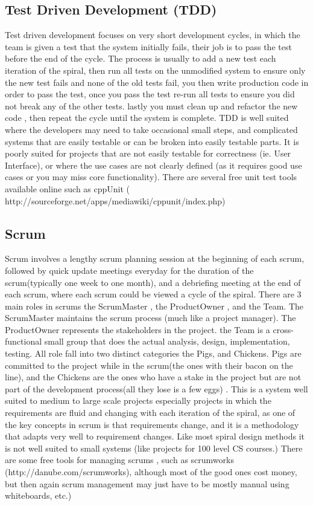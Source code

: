 \documentclass[10pt]{article}
\begin{document}
\subsection*{Test Driven Development (TDD)}
Test driven development focuses on very short development cycles, in which the team is given a test that the system initially fails, their job is to pass the test before the end of the cycle. The process is usually to add a new test each iteration of the spiral, then run all tests on the unmodified system to ensure only the new test fails and none of the old tests fail, you then write production code in order to pass the test, once you pass the test re-run all tests to ensure you did not break any of the other tests. lastly you must clean up and refactor the new code , then repeat the cycle until the system is complete. TDD is well suited where the developers may need to take occasional small steps, and complicated systems that are easily testable or can be broken into easily testable parts.  It is poorly suited for projects that are not easily testable for correctness (ie. User Interface), or where the use cases are not clearly defined (as it requires good use cases or you may miss core functionality). There are several free unit test tools available online such as cppUnit ( http://sourceforge.net/apps/mediawiki/cppunit/index.php)
\subsection*{Scrum}
Scrum involves a lengthy scrum planning session at the beginning of each scrum, followed by quick update meetings everyday for the duration of the scrum(typically one week to one month), and a debriefing meeting at the end of each scrum, where each scrum could be viewed a cycle of the spiral.  There are 3 main roles in scrums the ScrumMaster , the ProductOwner , and the Team.  The ScrumMaster maintains the scrum process (much like a project manager). The ProductOwner represents the stakeholders in the project. the Team is a cross-functional small group that does the actual analysis, design, implementation, testing.  All role fall into two distinct categories the Pigs, and Chickens. Pigs are committed to the project while in the scrum(the ones with their bacon on the line), and the Chickens are the ones who have a stake in the project but are not part of the development process(all they lose is a few eggs)	.  This is a system well suited to medium to large scale projects especially projects in which the requirements are fluid and changing with each iteration of the spiral, as one of the key concepts in scrum is that requirements change, and it is a methodology that adapts very well to requirement changes.  Like most spiral design methods it is not well suited to small systems (like projects for 100 level CS courses.)  There are some free tools for managing scrums , such as 
scrumworks (http://danube.com/scrumworks), although most of the good ones cost money, but then again scrum management may just have to be mostly manual using whiteboards, etc.)
\end{document}
